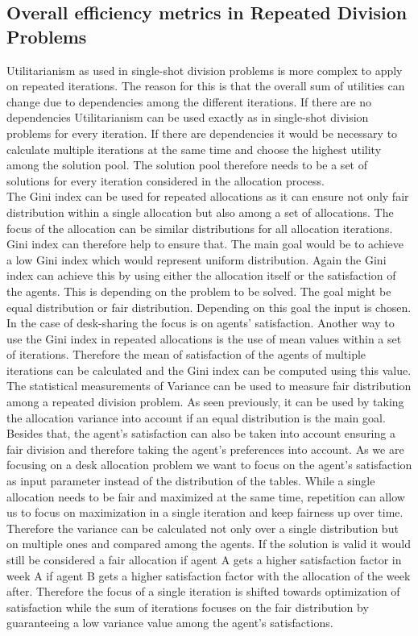 \documentclass[german, a4paper, 11pt, oneside]{scrbook}
\begin{document}
\subsection{Overall efficiency metrics in Repeated Division Problems}
Utilitarianism as used in single-shot division problems is more complex to apply on repeated iterations. The reason for this is that the overall sum of utilities can change due to dependencies among the different iterations. If there are no dependencies Utilitarianism can be used exactly as in single-shot division problems for every iteration. If there are dependencies it would be necessary to calculate multiple iterations at the same time and choose the highest utility among the solution pool. The solution pool therefore needs to be a set of solutions for every iteration considered in the allocation process.\\
The Gini index can be used for repeated allocations as it can ensure not only fair distribution within a single allocation but also among a set of allocations. The focus of the allocation can be similar distributions for all allocation iterations. Gini index can therefore help to ensure that. The main goal would be to achieve a low Gini index which would represent uniform distribution. Again the Gini index can achieve this by using either the allocation itself or the satisfaction of the agents. This is depending on the problem to be solved. The goal might be equal distribution or fair distribution. Depending on this goal the input is chosen. In the case of desk-sharing the focus is on agents' satisfaction. Another way to use the Gini index in repeated allocations is the use of mean values within a set of iterations. Therefore the mean of satisfaction of the agents of multiple iterations can be calculated and the Gini index can be computed using this value. 
\\
The statistical measurements of Variance can be used to measure fair distribution among a repeated division problem. As seen previously, it can be used by taking the allocation variance into account if an equal distribution is the main goal. Besides that, the agent's satisfaction can also be taken into account ensuring a fair division and therefore taking the agent's preferences into account. As we are focusing on a desk allocation problem we want to focus on the agent's satisfaction as input parameter instead of the distribution of the tables. While a single allocation needs to be fair and maximized at the same time, repetition can allow us to focus on maximization in a single iteration and keep fairness up over time. Therefore the variance can be calculated not only over a single distribution but on multiple ones and compared among the agents. If the solution is valid it would still be considered a fair allocation if agent A gets a higher satisfaction factor in week A if agent B gets a higher satisfaction factor with the allocation of the week after. Therefore the focus of a single iteration is shifted towards optimization of satisfaction while the sum of iterations focuses on the fair distribution by guaranteeing a low variance value among the agent's satisfactions.
\end{document}
